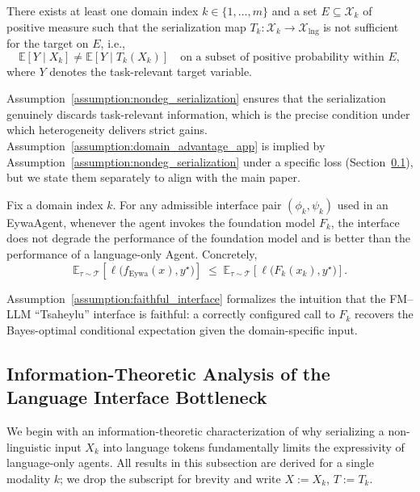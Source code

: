 \documentclass{llmxive}
\begin{document}
{\begin{assumption}
\label{assumption:nondeg_serialization}
There exists at least one domain index $k\in\{1,\dots,m\}$ and a set $E\subseteq\mathcal{X}_k$ of positive measure such that the serialization map $T_k:\mathcal{X}_k\to\mathcal{X}_{\mathrm{lng}}$ is not sufficient for the target on $E$, i.e.,
\begin{equation}
\mathbb{E}[Y\mid X_k]\neq \mathbb{E}[Y\mid T_k(X_k)] \quad \text{on a subset of positive probability within }E,
\end{equation}
where $Y$ denotes the task-relevant target variable.
\end{assumption}

Assumption~\ref{assumption:nondeg_serialization} ensures that the serialization genuinely discards task-relevant information, which is the precise condition under which heterogeneity delivers strict gains. Assumption~\ref{assumption:domain_advantage_app} is implied by Assumption~\ref{assumption:nondeg_serialization} under a specific loss (Section~\ref{app:info}), but we state them separately to align with the main paper.

\begin{assumption}
\label{assumption:faithful_interface}
Fix a domain index $k$. For any admissible interface pair $(\phi_k,\psi_k)$ used in an EywaAgent, whenever the agent invokes the foundation model $F_k$, the interface does not degrade the performance of the foundation model and is better than the performance of a language-only Agent. Concretely,
\[
\mathbb{E}_{\tau\sim\mathcal{T}}\!\left[\ell\big(f_{\mathrm{Eywa}}(x),y^\star\big)\right]
\;\le\;
\mathbb{E}_{\tau\sim\mathcal{T}}\!\left[\ell\big(F_k(x_k),y^\star\big)\right].
\]
\end{assumption}

Assumption~\ref{assumption:faithful_interface} formalizes the intuition that the FM--LLM ``Tsaheylu'' interface is faithful: a correctly configured call to $F_k$ recovers the Bayes-optimal conditional expectation given the domain-specific input.


\subsection{Information-Theoretic Analysis of the Language Interface Bottleneck}
\label{app:info}

We begin with an information-theoretic characterization of why serializing a non-linguistic input $X_k$ into language tokens fundamentally limits the expressivity of language-only agents. All results in this subsection are derived for a single modality $k$; we drop the subscript for brevity and write $X:=X_k$, $T:=T_k$.

}
\end{document}
